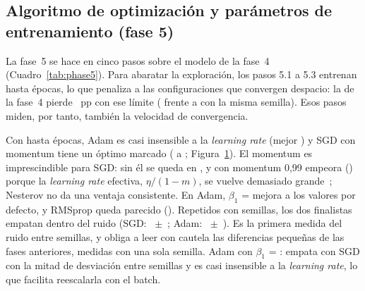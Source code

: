 \subsection{Algoritmo de optimización y parámetros de entrenamiento (fase 5)}
La fase~5 se hace en cinco pasos sobre el modelo de la fase~4 (Cuadro~\ref{tab:phase5}). Para abaratar la exploración,
los pasos 5.1 a 5.3 entrenan hasta  épocas, lo que penaliza a las configuraciones que
convergen despacio: la de la fase~4 pierde ~pp con ese límite ( frente
a  con la misma semilla). Esos pasos miden, por tanto, también la velocidad de
convergencia.

{Con hasta  épocas, Adam es casi insensible a la \emph{learning rate}
(mejor ) y SGD con momentum tiene un óptimo marcado ( a
; Figura~\ref{fig:lr}). El momentum es imprescindible para SGD: sin él se queda en
, y con momentum 0,99 empeora () porque la \emph{learning rate} efectiva,
$\eta/(1-m)$, se vuelve demasiado grande~\cite{sutskever}; Nesterov no da una ventaja consistente. En Adam,
$\beta_1$ =  mejora a los valores por defecto, y RMSprop queda parecido ().}
{Repetidos con  semillas, los dos finalistas empatan dentro del ruido (SGD:
~$\pm$~; Adam:
~$\pm$~). Es la primera medida del ruido entre semillas, y obliga
a leer con cautela las diferencias pequeñas de las fases anteriores, medidas con una sola semilla.}
{Adam con $\beta_1$ = : empata con SGD con la mitad de desviación entre semillas y es casi insensible
a la \emph{learning rate}, lo que facilita reescalarla con el batch.}

\begin{figure}[!htbp]
  \centering
  \caption{}
  \label{fig:lr}
\end{figure}


